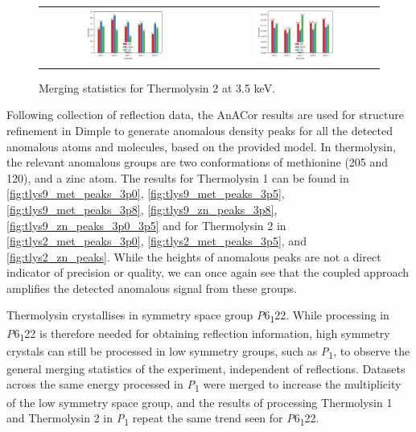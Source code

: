 \begin{figure}[h]
    \centering
    \begin{tabular}{cc}
    \includegraphics[width = 0.5\textwidth]{plots/exp1/tlys_2_P6122/3p5_I_over_sigma.png} & \includegraphics[width = 0.5\textwidth]{plots/exp1/tlys_2_P6122/3p5_rmerges.png}
    \end{tabular}
    \caption{Merging statistics for Thermolysin 2 at 3.5 \unit{keV}.}
    \label{fig:tlys_2_3p5}
\end{figure}

Following collection of reflection data, the AnACor results are used for structure refinement in Dimple to generate anomalous density peaks for all the detected anomalous atoms and molecules, based on the provided model. In thermolysin, the relevant anomalous groups are two conformations of methionine (205 and 120), and a zinc atom. The results for Thermolysin 1 can be found in \cref{fig:tlys9_met_peaks_3p0}, \cref{fig:tlys9_met_peaks_3p5}, \cref{fig:tlys9_met_peaks_3p8}, \cref{fig:tlys9_zn_peaks_3p8}, \cref{fig:tlys9_zn_peaks_3p0_3p5} and for Thermolysin 2 in \cref{fig:tlys2_met_peaks_3p0}, \cref{fig:tlys2_met_peaks_3p5}, and \cref{fig:tlys2_zn_peaks}.%
While the heights of anomalous peaks are not a direct indicator of precision or quality, we can once again see that the coupled approach amplifies the detected anomalous signal from these groups.

Thermolysin crystallises in symmetry space group \textit{P}6\textsubscript{1}22. While processing in \textit{P}6\textsubscript{1}22 is therefore needed for obtaining reflection information, high symmetry crystals can still be processed in low symmetry groups, such as \textit{P}\textsubscript{1}, to observe the general merging statistics of the experiment, independent of reflections.
Datasets across the same energy processed in \textit{P}\textsubscript{1} were merged to increase the multiplicity of the low symmetry space group, and the results of processing Thermolysin 1 and Thermolysin 2 in \textit{P}\textsubscript{1} repeat the same trend seen for \textit{P}6\textsubscript{1}22.

